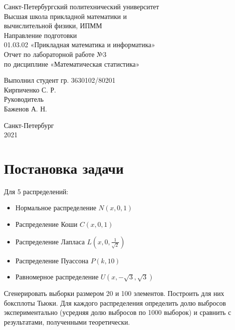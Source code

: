 \documentclass[a4paper,12pt]{article} %
\begin{document}

\large
\begin{center}
    Санкт-Петербургский политехнический университет\\
    Высшая школа прикладной математики и\\вычислительной физики, ИПММ\\
    \vspace{5em}
    Направление подготовки\\
    01.03.02 «Прикладная математика и информатика»\\
    \vspace{3em}
    Отчет по лабораторной работе №3\\
    по дисциплине «Математическая статистика»
    \vspace{15em}
\end{center}
Выполнил студент гр. 3630102/80201\\
Кирпиченко С. Р.\\
Руководитель\\
Баженов А. Н.
\vspace{7em}
\begin{center}
    Санкт-Петербург\\
    2021
\end{center}
\thispagestyle{empty}
\newpage
\tableofcontents
{}
\newpage
\listoffigures
{}
\newpage
\listoftables
{}
\thispagestyle{empty}
\newpage
\section{Постановка задачи}
Для 5 распределений:
\begin{itemize}
    \item Нормальное распределение $N(x, 0, 1)$
    \item Распределение Коши $C(x, 0, 1)$
    \item Распределение Лапласа $L(x, 0, \frac{1}{\sqrt{2}})$
    \item Распределение Пуассона $P(k, 10)$
    \item Равномерное распределение $U(x,-\sqrt{3},\sqrt{3})$
\end{itemize}
Сгенерировать выборки размером 20 и 100 элементов.
Построить для них боксплоты Тьюки.
Для каждого распределения определить долю выбросов экспериментально (усредняя долю выбросов по 1000 выборок) и сравнить с результатами, полученными теоретически.
\end{document}
